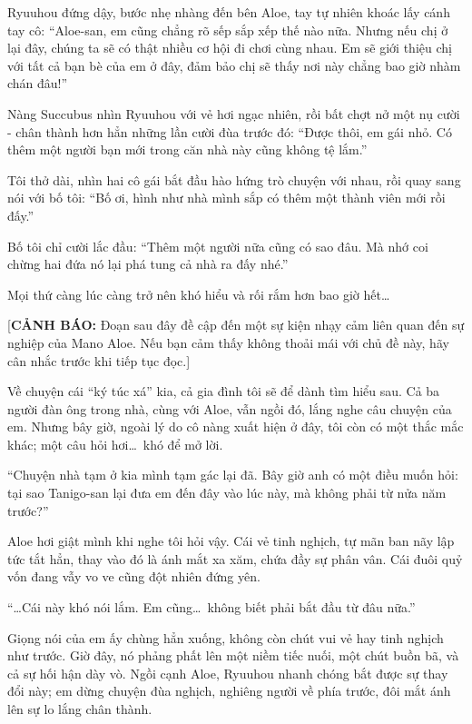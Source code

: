 \documentclass[../main.tex]{subfiles}
\begin{document}
Ryuuhou đứng dậy, bước nhẹ nhàng đến bên Aloe, tay tự nhiên khoác lấy cánh tay cô: ``Aloe-san, em cũng chẳng rõ sếp sắp xếp thế nào nữa. Nhưng nếu chị ở lại đây, chúng ta sẽ có thật nhiều cơ hội đi chơi cùng nhau. Em sẽ giới thiệu chị với tất cả bạn bè của em ở đây, đảm bảo chị sẽ thấy nơi này chẳng bao giờ nhàm chán đâu!''

Nàng Succubus nhìn Ryuuhou với vẻ hơi ngạc nhiên, rồi bất chợt nở một nụ cười - chân thành hơn hẳn những lần cười đùa trước đó: ``Được thôi, em gái nhỏ. Có thêm một người bạn mới trong căn nhà này cũng không tệ lắm.''

Tôi thở dài, nhìn hai cô gái bắt đầu hào hứng trò chuyện với nhau, rồi quay sang nói với bố tôi: ``Bố ơi, hình như nhà mình sắp có thêm một thành viên mới rồi đấy.''

Bố tôi chỉ cười lắc đầu: ``Thêm một người nữa cũng có sao đâu. Mà nhớ coi chừng hai đứa nó lại phá tung cả nhà ra đấy nhé.''

Mọi thứ càng lúc càng trở nên khó hiểu và rối rắm hơn bao giờ hết\dots

\ct

\begin{center}
  [{\color{red}\textbf{CẢNH BÁO:}} Đoạn sau đây đề cập đến một sự kiện nhạy cảm liên quan đến sự nghiệp của Mano Aloe. Nếu bạn cảm thấy không thoải mái với chủ đề này, hãy cân nhắc trước khi tiếp tục đọc.]
\end{center}

Về chuyện cái ``ký túc xá'' kia, cả gia đình tôi sẽ để dành tìm hiểu sau. Cả ba người đàn ông trong nhà, cùng với Aloe, vẫn ngồi đó, lắng nghe câu chuyện của em. Nhưng bây giờ, ngoài lý do cô nàng xuất hiện ở đây, tôi còn có một thắc mắc khác; một câu hỏi hơi\dots\ khó để mở lời.

``Chuyện nhà tạm ở kia mình tạm gác lại đã. Bây giờ anh có một điều muốn hỏi: tại sao Tanigo-san lại đưa em đến đây vào lúc này, mà không phải từ nửa năm trước?''

Aloe hơi giật mình khi nghe tôi hỏi vậy. Cái vẻ tinh nghịch, tự mãn ban nãy lập tức tắt hẳn, thay vào đó là ánh mắt xa xăm, chứa đầy sự phân vân. Cái đuôi quỷ vốn đang vẫy vo ve cũng đột nhiên đứng yên.

``\dots Cái này khó nói lắm. Em cũng\dots\ không biết phải bắt đầu từ đâu nữa.''

Giọng nói của em ấy chùng hẳn xuống, không còn chút vui vẻ hay tinh nghịch như trước. Giờ đây, nó phảng phất lên một niềm tiếc nuối, một chút buồn bã, và cả sự hối hận dày vò. Ngồi cạnh Aloe, Ryuuhou nhanh chóng bắt được sự thay đổi này; em dừng chuyện đùa nghịch, nghiêng người về phía trước, đôi mắt ánh lên sự lo lắng chân thành.
\end{document}
